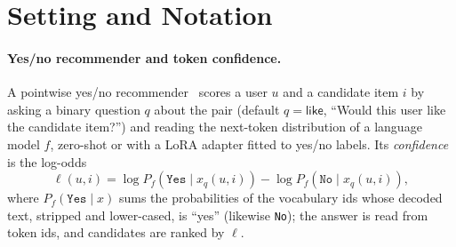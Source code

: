 \section{Setting and Notation}
\label{sec:prelim}

\paragraph{Yes/no recommender and token confidence.}
A pointwise yes/no recommender~\citep{bao2023tallrec,zhang2025collm} scores a user $u$ and a candidate item $i$ by asking a
binary question $q$ about the pair (default $q=\textsf{like}$, ``Would this user like the candidate item?'') and reading the
next-token distribution of a language model $f$, zero-shot or with a LoRA adapter fitted to yes/no labels. Its
\emph{confidence} is the log-odds
\begin{equation}\label{eq:logit}
  \ell(u,i)=\log P_f(\texttt{Yes}\mid x_q(u,i))-\log P_f(\texttt{No}\mid x_q(u,i)),
\end{equation}
where $P_f(\texttt{Yes}\mid x)$ sums the probabilities of the vocabulary ids whose decoded text, stripped and lower-cased, is
``yes'' (likewise \texttt{No}); the answer is read from token ids, and candidates are ranked by $\ell$.

